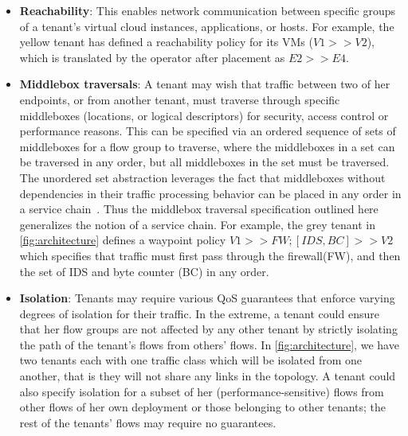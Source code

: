 \begin{itemize}
\item \textbf{Reachability}: This enables network communication
  between specific groups of a tenant's virtual cloud instances,
  applications, or hosts. For example, the yellow tenant has defined a reachability
  policy for its VMs ($V1 >> V2$), which is translated by the operator after 
  placement as $E2 >> E4$.
\item \textbf{Middlebox traversals}: A tenant may wish that traffic
  between two of her endpoints, or from another tenant, must traverse
  through specific middleboxes (locations, or logical descriptors) for
  security, access control or performance reasons. This can be
  specified via an ordered sequence of sets of middleboxes for a flow
  group to traverse, where the middleboxes in a set can be traversed
  in any order, but all middleboxes in the set must be traversed.  The
  unordered set abstraction leverages the fact that middleboxes
  without dependencies in their traffic processing behavior can be
  placed in any order in a service chain~\cite{pga}. Thus the
  middlebox traversal specification outlined here generalizes the
  notion of a service chain. For example, the grey tenant in \cref{fig:architecture}
  defines a waypoint policy $V1 >> FW; [IDS,BC] >> V2$
   which specifies that traffic must first pass through the firewall(FW),
  and then the set of IDS and byte counter (BC) in any order. 


\item \textbf{Isolation}: Tenants may require various QoS guarantees
  that enforce varying degrees of isolation for their traffic. In the
  extreme, a tenant could ensure that her flow groups are not affected
  by any other tenant by strictly isolating the path of the tenant's
  flows from others' flows. In \cref{fig:architecture}, we have two tenants
  each with one traffic class which will be isolated from one another, that is
  they will not share any links in the topology. 
  A tenant could also specify isolation for a subset of her
  (performance-sensitive) flows from other flows of her own deployment
  or those belonging to other tenants; the rest of the tenants' flows
  may require no guarantees.


\end{itemize}
